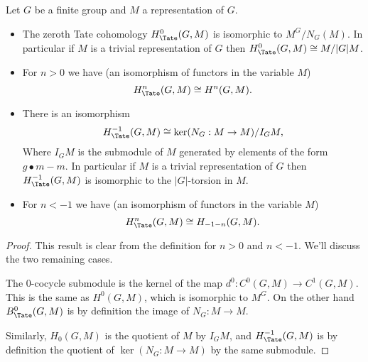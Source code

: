 \begin{lemma}	\label{lem:Tate cohomology is cohomology or homology}
	\leanok
	Let $G$ be a finite group and $M$ a representation of $G$.
	\begin{itemize}
		\item
		The zeroth Tate cohomology $H^0_{\Tate}(G,M)$ is isomorphic to $M^G / N_G(M)$.
		In particular if $M$ is a trivial representation of $G$ then
		$H^0_{\Tate}(G,M) \cong M / |G|M$.
		\item
		For $n >0 $ we have (an isomorphism of functors in the variable $M$)
		\[
			H^{n}_{\Tate}(G,M) \cong H^{n}(G,M).
		\]
		\item
		There is an isomorphism
		\[
			H^{-1}_{\Tate}(G,M) \cong \ker (N_G : M \to M ) / I_G M,
		\]
		Where $I_GM$ is the submodule of $M$ generated by elements of the form $g \bullet m - m$.
		In particular if $M$ is a trivial representation of $G$ then
		$H^{-1}_{\Tate}(G,M)$ is isomorphic to the $|G|$-torsion in $M$.
		\item
		For $n < -1$ we have (an isomorphism of functors in the variable $M$)
		\[
			H^{n}_{\Tate}(G,M) \cong H_{-1-n} (G,M).
		\]
	\end{itemize}
\end{lemma}

\begin{proof}
	\leanok
	This result is clear from the definition for $n > 0$ and $n < -1$. We'll discuss
	the two remaining cases.

	The $0$-cocycle submodule is the kernel of the map $d^0 : C^0(G,M) \to C^1(G,M)$.
	This is the same as $H^0(G,M)$, which is isomorphic to $M^G$.
	On the other hand $B^0_{\Tate}(G,M)$ is by definition the image of $N_G : M \to M$.

	Similarly, $H_0(G,M)$ is the quotient of $M$ by $I_GM$,
	and $H^{-1}_{\Tate}(G,M)$ is by definition the quotient of $\ker(N_G : M \to M)$
	by the same submodule.
\end{proof}

